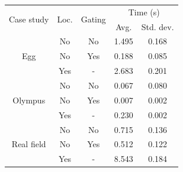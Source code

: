 \begin{tabular}{ccc cc}
\toprule
    \multirow{2}{*}{Case study} & 
    \multirow{2}{*}{Loc.} & 
    \multirow{2}{*}{Gating} & 
    \multicolumn{2}{c}{Time (s)} \\
    & & & Avg. & Std. dev. \\
\midrule
    \multirow{3}{*}{Egg} & No & No & 1.495 & 0.168 \\
                      & No & Yes & 0.188 & 0.085 \\
                      & Yes & - & 2.683 & 0.201 \\
\midrule
    \multirow{3}{*}{Olympus} & No & No & 0.067 & 0.080 \\
                          & No & Yes & 0.007 & 0.002 \\
                          & Yes & - & 0.230 & 0.002 \\
\midrule
    \multirow{3}{*}{Real field} & No & No & 0.715 & 0.136 \\
                             & No & Yes & 0.512 & 0.122 \\
                             & Yes & - & 8.543 & 0.184 \\
\bottomrule
\end{tabular}